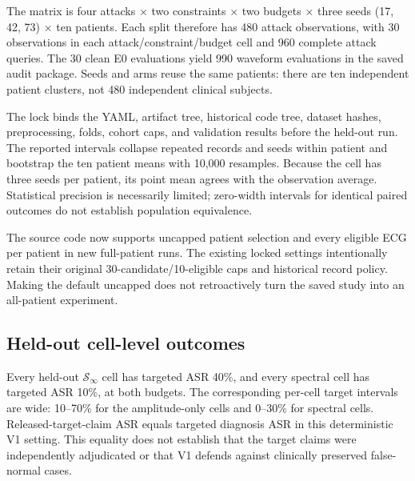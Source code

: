The matrix is four attacks $\times$ two constraints $\times$ two budgets $\times$ three seeds (17, 42, 73) $\times$ ten patients. Each split therefore has 480 attack observations, with 30 observations in each attack/constraint/budget cell and 960 complete attack queries. The 30 clean E0 evaluations yield 990 waveform evaluations in the saved audit package. Seeds and arms reuse the same patients: there are ten independent patient clusters, not 480 independent clinical subjects.

The lock binds the YAML, artifact tree, historical code tree, dataset hashes, preprocessing, folds, cohort caps, and validation results before the held-out run. The reported intervals collapse repeated records and seeds within patient and bootstrap the ten patient means with 10,000 resamples. Because the cell has three seeds per patient, its point mean agrees with the observation average. Statistical precision is necessarily limited; zero-width intervals for identical paired outcomes do not establish population equivalence.

The source code now supports uncapped patient selection and every eligible ECG per patient in new full-patient runs. The existing locked settings intentionally retain their original 30-candidate/10-eligible caps and historical record policy. Making the default uncapped does not retroactively turn the saved study into an all-patient experiment.

\subsection{Held-out cell-level outcomes}
\begin{table}[htbp]\centering\scriptsize
\resizebox{\linewidth}{!}{}
\caption{Complete locked held-out E1 matrix. Target ASR includes saved patient-bootstrap 95\% intervals; the remaining columns are point estimates. Every cell has ten selected patients and three seeds. All outcomes are automated nonclinical measurements of the internal waveform-callable victim.}\label{tab:securityheldout}\end{table}


Every held-out $\mathcal S_\infty$ cell has targeted ASR 40\%, and every spectral cell has targeted ASR 10\%, at both budgets. The corresponding per-cell target intervals are wide: 10--70\% for the amplitude-only cells and 0--30\% for spectral cells. Released-target-claim ASR equals targeted diagnosis ASR in this deterministic V1 setting. This equality does not establish that the target claims were independently adjudicated or that V1 defends against clinically preserved false-normal cases.

